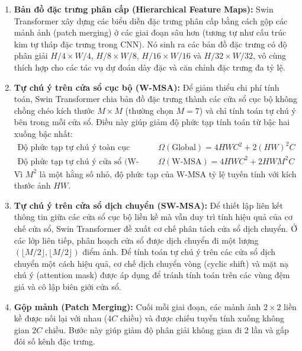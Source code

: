 \documentclass[11pt, a4paper]{article}
\begin{document}
\begin{enumerate}
    \item \textbf{Bản đồ đặc trưng phân cấp (Hierarchical Feature Maps):} Swin Transformer xây dựng các biểu diễn đặc trưng phân cấp bằng cách gộp các mảnh ảnh (patch merging) ở các giai đoạn sâu hơn (tương tự như cấu trúc kim tự tháp đặc trưng trong CNN). Nó sinh ra các bản đồ đặc trưng có độ phân giải $H/4 \times W/4$, $H/8 \times W/8$, $H/16 \times W/16$ và $H/32 \times W/32$, vô cùng thích hợp cho các tác vụ dự đoán dày đặc và căn chỉnh đặc trưng đa tỷ lệ.
    
    \item \textbf{Tự chú ý trên cửa sổ cục bộ (W-MSA):} Để giảm thiểu chi phí tính toán, Swin Transformer chia bản đồ đặc trưng thành các cửa sổ cục bộ không chồng chéo kích thước $M \times M$ (thường chọn $M=7$) và chỉ tính toán tự chú ý bên trong mỗi cửa sổ. Điều này giúp giảm độ phức tạp tính toán từ bậc hai xuống bậc nhất:
    \begin{align}
        \text{Độ phức tạp tự chú ý toàn cục (ViT):} \quad &\Omega(\text{Global}) = 4HWC^2 + 2(HW)^2 C \\
        \text{Độ phức tạp tự chú ý cửa sổ (W-MSA):} \quad &\Omega(\text{W-MSA}) = 4HWC^2 + 2HWM^2 C
    \end{align}
    Vì $M^2$ là một hằng số nhỏ, độ phức tạp của W-MSA tỷ lệ tuyến tính với kích thước ảnh $HW$.
    
    \item \textbf{Tự chú ý trên cửa sổ dịch chuyển (SW-MSA):} Để thiết lập liên kết thông tin giữa các cửa sổ cục bộ liền kề mà vẫn duy trì tính hiệu quả của cơ chế cửa sổ, Swin Transformer đề xuất cơ chế phân tách cửa sổ dịch chuyển. Ở các lớp liên tiếp, phân hoạch cửa sổ được dịch chuyển đi một lượng $(\lfloor M/2 \rfloor, \lfloor M/2 \rfloor)$ điểm ảnh. Để tính toán tự chú ý trên các cửa sổ dịch chuyển một cách hiệu quả, cơ chế dịch chuyển vòng (cyclic shift) và mặt nạ chú ý (attention mask) được áp dụng để tránh tính toán trên các vùng đệm giả và cô lập biên giới cửa sổ.
    
    \item \textbf{Gộp mảnh (Patch Merging):} Cuối mỗi giai đoạn, các mảnh ảnh $2 \times 2$ liền kề được nối lại với nhau ($4C$ chiều) và được chiếu tuyến tính xuống không gian $2C$ chiều. Bước này giúp giảm độ phân giải không gian đi 2 lần và gấp đôi số kênh đặc trưng.
\end{enumerate}

\end{document}
